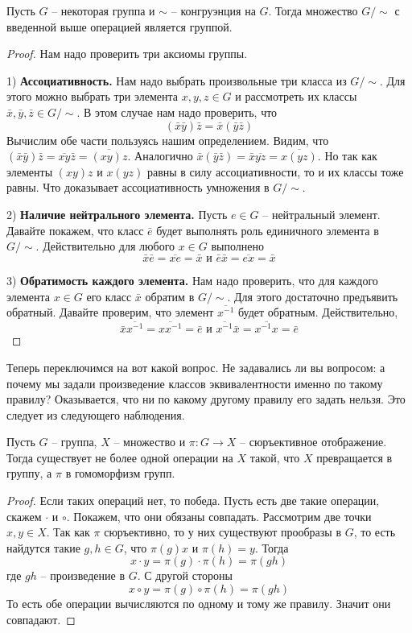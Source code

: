 \begin{claim}
Пусть $G$ -- некоторая группа и $\sim$ -- конгруэнция на $G$.
Тогда множество $G/{\sim}$ с введенной выше операцией является группой.
\end{claim}
\begin{proof}
Нам надо проверить три аксиомы группы.

1) \textbf{Ассоциативность.}
Нам надо выбрать произвольные три класса из $G/{\sim}$.
Для этого можно выбрать три элемента $x,y,z\in G$ и рассмотреть их классы $\bar x, \bar y, \bar z\in G/{\sim}$.
В этом случае нам надо проверить, что
\[
(\bar x \bar y) \bar z = \bar x (\bar y \bar z)
\]
Вычислим обе части пользуясь нашим определением.
Видим, что $(\bar x \bar y) \bar z = \overline{xy}\bar z = \overline{(xy)z}$.
Аналогично $\bar x (\bar y \bar z) = \bar x \overline{yz} = \overline{x(yz)}$.
Но так как элементы $(xy)z$ и $x(yz)$ равны в силу ассоциативности, то и их классы тоже равны.
Что доказывает ассоциативность умножения в $G/{\sim}$.

2) \textbf{Наличие нейтрального элемента.}
Пусть $e\in G$ -- нейтральный элемент.
Давайте покажем, что класс $\bar  e$ будет выполнять роль единичного элемента в $G/{\sim}$.
Действительно для любого $x\in G$ выполнено
\[
\bar x \bar e = \overline{xe} = \bar x\text{ и }\bar e \bar x = \overline{ex} = \bar x
\]

3) \textbf{Обратимость каждого элемента.}
Нам надо проверить, что для каждого элемента $x\in G$ его класс $\bar x$ обратим в $G/{\sim}$.
Для этого достаточно предъявить обратный.
Давайте проверим, что элемент $\overline{x^{-1}}$ будет обратным.
Действительно,
\[
\bar x \overline{x^{-1}} = \overline{x x^{-1}} = \bar e \text{ и }\overline{x^{-1}} \bar x  = \overline{x^{-1} x} = \bar e
\]
\end{proof}

Теперь переключимся на вот какой вопрос.
Не задавались ли вы вопросом: а почему мы задали произведение классов эквивалентности именно по такому правилу?
Оказывается, что ни по какому другому правилу его задать нельзя.
Это следует из следующего наблюдения.

\begin{claim}
Пусть $G$ -- группа, $X$ -- множество и $\pi \colon G\to X$ -- сюръективное отображение.
Тогда существует не более одной операции на $X$ такой, что $X$ превращается в группу, а $\pi$ в гомоморфизм групп.
\end{claim}
\begin{proof}
Если таких операций нет, то победа.
Пусть есть две такие операции, скажем $\cdot$ и $\circ$.
Покажем, что они обязаны совпадать.
Рассмотрим две точки $x, y\in X$.
Так как $\pi$ сюръективно, то у них существуют прообразы в $G$, то есть найдутся такие $g,h\in G$, что $\pi(g) x$ и $\pi(h) = y$.
Тогда
\[
x\cdot y = \pi(g) \cdot \pi(h) = \pi(g h)
\]
где $gh$ -- произведение в $G$.
С другой стороны
\[
x \circ y = \pi(g) \circ \pi(h) = \pi(gh)
\]
То есть обе операции вычисляются по одному и тому же правилу.
Значит они совпадают.
\end{proof}

